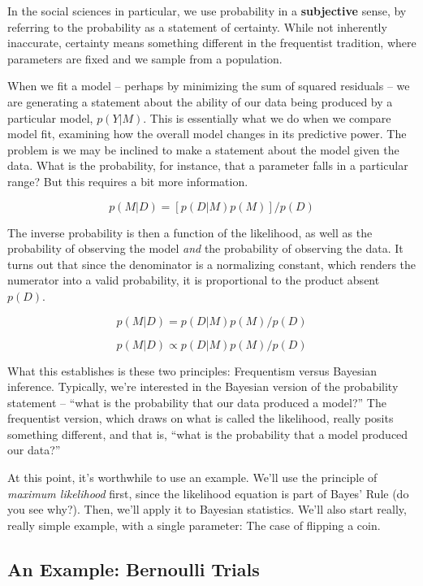 \documentclass[
]{book}
\begin{document}
In the social sciences in particular, we use probability in a \textbf{subjective} sense, by referring to the probability as a statement of certainty. While not inherently inaccurate, certainty means something different in the frequentist tradition, where parameters are fixed and we sample from a population.

When we fit a model -- perhaps by minimizing the sum of squared residuals -- we are generating a statement about the ability of our data being produced by a particular model, \(p(Y|M)\). This is essentially what we do when we compare model fit, examining how the overall model changes in its predictive power. The problem is we may be inclined to make a statement about the model given the data. What is the probability, for instance, that a parameter falls in a particular range? But this requires a bit more information.

\[p(M|D) =[p(D|M) p(M)]/p(D)\]

The inverse probability is then a function of the likelihood, as well as the probability of observing the model \emph{and} the probability of observing the data. It turns out that since the denominator is a normalizing constant, which renders the numerator into a valid probability, it is proportional to the product absent \(p(D)\).

\[p(M|D) = p(D|M) p(M)/p(D)\]

\[p(M|D) \propto p(D|M) p(M)/p(D) \]

What this establishes is these two principles: Frequentism versus Bayesian inference. Typically, we're interested in the Bayesian version of the probability statement -- ``what is the probability that our data produced a model?'' The frequentist version, which draws on what is called the likelihood, really posits something different, and that is, ``what is the probability that a model produced our data?''

At this point, it's worthwhile to use an example. We'll use the principle of \emph{maximum likelihood} first, since the likelihood equation is part of Bayes' Rule (do you see why?). Then, we'll apply it to Bayesian statistics. We'll also start really, really simple example, with a single parameter: The case of flipping a coin.

\subsection{An Example: Bernoulli Trials}\label{an-example-bernoulli-trials}
\end{document}
